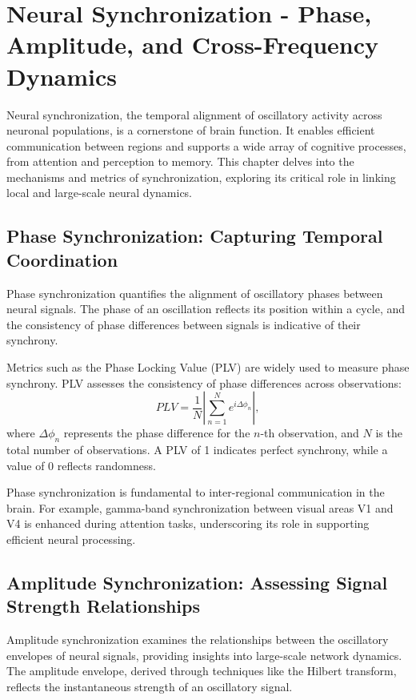 \section{Neural Synchronization - Phase, Amplitude, and Cross-Frequency Dynamics}

Neural synchronization, the temporal alignment of oscillatory activity across neuronal populations, is a cornerstone of brain function. It enables efficient communication between regions and supports a wide array of cognitive processes, from attention and perception to memory. This chapter delves into the mechanisms and metrics of synchronization, exploring its critical role in linking local and large-scale neural dynamics.

\subsection*{Phase Synchronization: Capturing Temporal Coordination}

Phase synchronization quantifies the alignment of oscillatory phases between neural signals. The phase of an oscillation reflects its position within a cycle, and the consistency of phase differences between signals is indicative of their synchrony. 

Metrics such as the Phase Locking Value (PLV) are widely used to measure phase synchrony. PLV assesses the consistency of phase differences across observations:
\begin{equation}
PLV = \frac{1}{N}\left| \sum_{n=1}^N e^{i\Delta \phi_n} \right|,
\end{equation}
where $\Delta \phi_n$ represents the phase difference for the $n$-th observation, and $N$ is the total number of observations. A PLV of 1 indicates perfect synchrony, while a value of 0 reflects randomness. 

Phase synchronization is fundamental to inter-regional communication in the brain. For example, gamma-band synchronization between visual areas V1 and V4 is enhanced during attention tasks, underscoring its role in supporting efficient neural processing.

\subsection*{Amplitude Synchronization: Assessing Signal Strength Relationships}

Amplitude synchronization examines the relationships between the oscillatory envelopes of neural signals, providing insights into large-scale network dynamics. The amplitude envelope, derived through techniques like the Hilbert transform, reflects the instantaneous strength of an oscillatory signal. 

